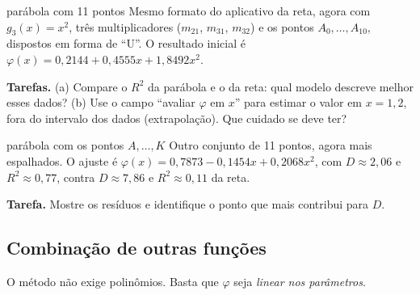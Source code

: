 \begin{atividade}{parábola com 11 pontos}{\arqParabRol}
Mesmo formato do aplicativo da reta, agora com $g_3(x)=x^2$, três multiplicadores ($m_{21}$, $m_{31}$,
$m_{32}$) e os pontos $A_0,\dots,A_{10}$, dispostos em forma de ``U''. O resultado inicial é
$\varphi(x)=0{,}2144+0{,}4555x+1{,}8492x^2$.

\textbf{Tarefas.} (a) Compare o $R^2$ da parábola e o da reta: qual modelo descreve melhor esses dados?
(b) Use o campo ``avaliar $\varphi$ em $x$'' para estimar o valor em $x=1{,}2$, fora do intervalo dos
dados (extrapolação). Que cuidado se deve ter?
\end{atividade}

\begin{atividade}{parábola com os pontos $A,\dots,K$}{\arqAproxRol}
Outro conjunto de 11 pontos, agora mais espalhados. O ajuste é
$\varphi(x)=0{,}7873-0{,}1454x+0{,}2068x^2$, com $D\approx2{,}06$ e $R^2\approx0{,}77$, contra
$D\approx7{,}86$ e $R^2\approx0{,}11$ da reta.

\textbf{Tarefa.} Mostre os resíduos e identifique o ponto que mais contribui para $D$.
\end{atividade}

\subsection{Combinação de outras funções}

O método não exige polinômios. Basta que $\varphi$ seja \emph{linear nos parâmetros}.

